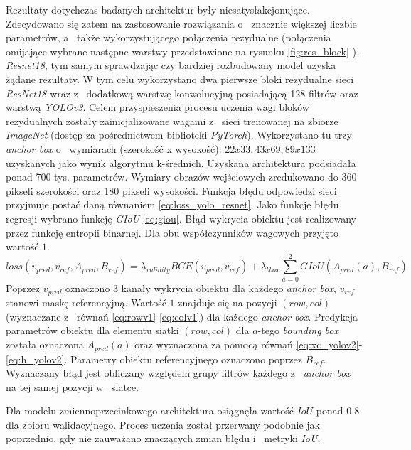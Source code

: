 Rezultaty dotychczas badanych architektur były niesatysfakcjonujące.
Zdecydowano się zatem na zastosowanie rozwiązania o~ znacznie większej liczbie parametrów, a~ także wykorzystującego połączenia rezydualne (połączenia omijające wybrane następne warstwy przedstawione na rysunku \ref{fig:res_block} )- \emph{Resnet18}\cite{resnet18}, tym samym sprawdzając czy bardziej rozbudowany model uzyska żądane rezultaty. 
W tym celu wykorzystano dwa pierwsze bloki rezydualne sieci \emph{ResNet18} wraz z~ dodatkową warstwę konwolucyjną posiadającą 128 filtrów oraz warstwą \emph{YOLOv3}. 
Celem przyspieszenia procesu uczenia wagi bloków rezydualnych zostały zainicjalizowane wagami z~ sieci trenowanej na zbiorze \emph{ImageNet}\cite{imagenet} (dostęp za pośrednictwem biblioteki \emph{PyTorch}).
Wykorzystano tu trzy \emph{anchor box} o~ wymiarach (szerokość x wysokość): $22x33, 43x69, 89x133$ uzyskanych jako wynik algorytmu k-średnich. 
Uzyskana architektura podsiadała ponad 700 tys. parametrów.
Wymiary obrazów wejściowych zredukowano do 360 pikseli szerokości oraz 180 pikseli wysokości.
Funkcja błędu odpowiedzi sieci przyjmuje postać daną równaniem \eqref{eq:loss_yolo_resnet}.
Jako funkcję błędu regresji wybrano funkcję \emph{GIoU} \eqref{eq:giou}.
Błąd wykrycia obiektu jest realizowany przez funkcję entropii binarnej.
Dla obu współczynników wagowych przyjęto wartość $1$.
\begin{equation}
loss(v_{pred},v_{ref},A_{pred}, B_{ref}) = \lambda_{validity} BCE(v_{pred}, v_{ref}) + \lambda_{bbox} \sum_{a = 0}^{2} GIoU(A_{pred}(a), B_{ref})
\label{eq:loss_yolo_resnet}
\end{equation}
Poprzez $v_{pred}$ oznaczono 3 kanały wykrycia obiektu dla każdego \emph{anchor box}, 
$v_{ref}$ stanowi maskę referencyjną.
Wartość $1$ znajduje się na pozycji $(row,col)$ (wyznaczane z~ równań \eqref{eq:rowv1}-\eqref{eq:colv1}) dla każdego \emph{anchor box}.
Predykcja parametrów obiektu dla elementu siatki $(row,col)$ dla $a$-tego \emph{bounding box} została oznaczona $A_{pred}(a)$ oraz wyznaczona za pomocą równań \eqref{eq:xc_yolov2}-\eqref{eq:h_yolov2}.
Parametry obiektu referencyjnego oznaczono poprzez $B_{ref}$. 
Wyznaczany błąd jest obliczany względem grupy filtrów każdego z~ \emph{anchor box} na tej samej pozycji w~ siatce.


Dla modelu zmiennoprzecinkowego architektura osiągnęła wartość $IoU$ ponad $0.8$ dla zbioru walidacyjnego. Proces uczenia został przerwany podobnie jak poprzednio, gdy nie zauważano znaczących zmian błędu i~ metryki \emph{IoU}.

